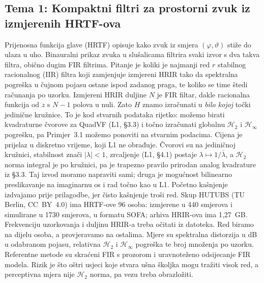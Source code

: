 \documentclass[10pt,a4paper]{article}
\newcommand{\Htwo}{\mathcal{H}_2}
\newcommand{\Hinf}{\mathcal{H}_\infty}
\begin{document}
\subsection*{Tema 1: Kompaktni filtri za prostorni zvuk iz izmjerenih HRTF-ova}
Prijenosna funkcija glave (HRTF) opisuje kako zvuk iz smjera $(\varphi,\vartheta)$ stiže do ulaza u
uho. Binauralni prikaz zvuka u slušalicama filtrira svaki izvor s dva takva filtra, obično dugim FIR
filtrima. Pitanje je koliki je najmanji red $r$ stabilnog racionalnog (IIR) filtra koji zamjenjuje
izmjereni HRIR tako da spektralna pogreška u čujnom pojasu ostane ispod zadanog praga, te koliko se
time štedi računanja po uzorku. Izmjereni HRIR duljine $N$ je FIR filtar, dakle racionalna funkcija
od $z$ s $N-1$ polova u nuli. Zato $H$ znamo izračunati u \emph{bilo kojoj} točki jedinične kružnice.
To je kod stvarnih podataka rijetko: možemo birati kvadraturne čvorove za QuadVF (L1, §3.3) i točno
izračunati globalnu $\Htwo$ i $\Hinf$ pogrešku, pa Primjer~3.1 možemo ponoviti na stvarnim podacima.
Cijena je prijelaz u diskretno vrijeme, koji L1 ne obrađuje. Čvorovi su na jediničnoj kružnici,
stabilnost znači $\lvert\lambda\rvert<1$, zrcaljenje (L1, §4.1) postaje $\lambda\mapsto1/\overline{\lambda}$,
a $\Htwo$ norma integral je po kružnici, pa je trapezno pravilo prirodan analog kvadrature iz §3.3.
Taj izvod moramo napraviti sami; druga je mogućnost bilinearno preslikavanje na imaginarnu os i
rad točno kao u L1. Početno kašnjenje izdvajamo prije prilagodbe, jer čisto kašnjenje troši red.
Skup HUTUBS (TU Berlin, CC~BY~4.0) ima HRTF-ove 96 osoba: izmjerene u 440 smjerova i simulirane u
1730 smjerova, u formatu SOFA; arhiva HRIR-ova ima 1,27~GB. Frekvenciju uzorkovanja i duljinu HRIR-a
treba očitati iz datoteka. Red biramo na dijelu osoba, a provjeravamo na ostalima. Mjere su
spektralna distorzija u dB u odabranom pojasu, relativna $\Htwo$ i $\Hinf$ pogreška te broj množenja
po uzorku. Referentne metode su skraćeni FIR s prozorom i uravnoteženo odsijecanje FIR modela.
Rizik je što oštri usjeci koje stvara ušna školjka mogu tražiti visok red, a perceptivna mjera nije
$\Htwo$ norma, pa vezu treba obrazložiti.
\end{document}
